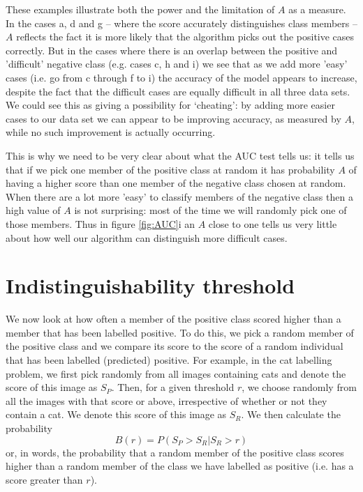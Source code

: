 \documentclass[preprint,12pt]{elsarticle}
\begin{document}
These examples illustrate both the power and the limitation of $A$ as a measure. In the cases a, d and g – where the score accurately distinguishes class members – $A$ reflects the fact it is more likely that the algorithm picks out the positive cases correctly. But in the cases where there is an overlap between the positive and 'difficult' negative class (e.g. cases c, h and i) we see that as we add more 'easy' cases (i.e. go from c through f to i) the accuracy of the model appears to increase, despite the fact that the difficult cases are equally difficult in all three data sets. We could see this as giving a possibility for `cheating': by adding more easier cases to our data set we can appear to be improving accuracy, as measured by $A$, while no such improvement is actually occurring. 

This is why we need to be very clear about what the AUC test tells us: it tells us that if we pick one member of the positive class at random it has probability $A$ of having a higher score than one member of the negative class chosen at random. When there are a lot more 'easy'  to classify members of the negative class then a high value of $A$ is not surprising: most of the time we will randomly pick one of those members. Thus in figure \ref{fig:AUC}i  an $A$ close to one tells us very little about how well our algorithm can distinguish more difficult cases. 

\section{Indistinguishability threshold}

We now look at how often a member of the positive class scored higher than a member that has been labelled positive. To do this, we pick a random member of the positive class and we compare its score to the score of a random individual that has been labelled (predicted) positive. For example, in the cat labelling problem, we first pick randomly from all images containing cats and denote the score of this image as $S_P$. Then, for a given threshold $r$, we choose randomly from all the images with that score or above, irrespective of whether or not they contain a cat. We denote this score of this image as $S_R$. We then calculate the probability 
\[
B(r) = P(S_P>S_R | S_R>r) 
\]
or, in words, the probability that a random member of the positive class scores higher than a random member of the class we have labelled as positive (i.e. has a score greater than $r$). 
\end{document}

